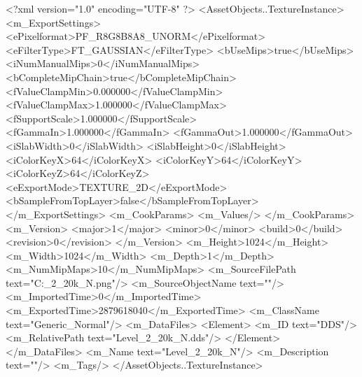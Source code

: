 <?xml version="1.0" encoding="UTF-8" ?>
<AssetObjects..TextureInstance>
	<m_ExportSettings>
		<ePixelformat>PF_R8G8B8A8_UNORM</ePixelformat>
		<eFilterType>FT_GAUSSIAN</eFilterType>
		<bUseMips>true</bUseMips>
		<iNumManualMips>0</iNumManualMips>
		<bCompleteMipChain>true</bCompleteMipChain>
		<fValueClampMin>0.000000</fValueClampMin>
		<fValueClampMax>1.000000</fValueClampMax>
		<fSupportScale>1.000000</fSupportScale>
		<fGammaIn>1.000000</fGammaIn>
		<fGammaOut>1.000000</fGammaOut>
		<iSlabWidth>0</iSlabWidth>
		<iSlabHeight>0</iSlabHeight>
		<iColorKeyX>64</iColorKeyX>
		<iColorKeyY>64</iColorKeyY>
		<iColorKeyZ>64</iColorKeyZ>
		<eExportMode>TEXTURE_2D</eExportMode>
		<bSampleFromTopLayer>false</bSampleFromTopLayer>
	</m_ExportSettings>
	<m_CookParams>
		<m_Values/>
	</m_CookParams>
	<m_Version>
		<major>1</major>
		<minor>0</minor>
		<build>0</build>
		<revision>0</revision>
	</m_Version>
	<m_Height>1024</m_Height>
	<m_Width>1024</m_Width>
	<m_Depth>1</m_Depth>
	<m_NumMipMaps>10</m_NumMipMaps>
	<m_SourceFilePath text="C:\Users\Shadow\Desktop\Prototypes\Level_2_20k_N.png"/>
	<m_SourceObjectName text=""/>
	<m_ImportedTime>0</m_ImportedTime>
	<m_ExportedTime>2879618040</m_ExportedTime>
	<m_ClassName text="Generic_Normal"/>
	<m_DataFiles>
		<Element>
			<m_ID text="DDS"/>
			<m_RelativePath text="Level_2_20k_N.dds"/>
		</Element>
	</m_DataFiles>
	<m_Name text="Level_2_20k_N"/>
	<m_Description text=""/>
	<m_Tags/>
</AssetObjects..TextureInstance>


